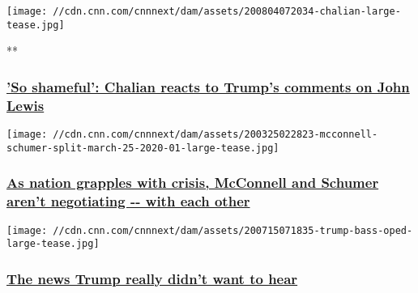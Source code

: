 \href{/videos/politics/2020/08/04/donald-trump-john-lewis-axios-chalian-newday-vpx.cnn}{}

\texttt{[image: //cdn.cnn.com/cnnnext/dam/assets/200804072034-chalian-large-tease.jpg]}

**

\hypertarget{so-shameful-chalian-reacts-to-trumps-comments-on-john-lewis}{%
\subsubsection{\texorpdfstring{\href{/videos/politics/2020/08/04/donald-trump-john-lewis-axios-chalian-newday-vpx.cnn}{'So
shameful': Chalian reacts to Trump's comments on John
Lewis}}{'So shameful': Chalian reacts to Trump's comments on John Lewis}}\label{so-shameful-chalian-reacts-to-trumps-comments-on-john-lewis}}

\href{/2020/08/03/politics/chuck-schumer-mitch-mcconnell-stimulus-negotiations/index.html}{}

\texttt{[image: //cdn.cnn.com/cnnnext/dam/assets/200325022823-mcconnell-schumer-split-march-25-2020-01-large-tease.jpg]}

\hypertarget{as-nation-grapples-with-crisis-mcconnell-and-schumer-arent-negotiating----with-each-other}{%
\subsubsection{\texorpdfstring{\href{/2020/08/03/politics/chuck-schumer-mitch-mcconnell-stimulus-negotiations/index.html}{As
nation grapples with crisis, McConnell and Schumer aren't negotiating
-\/- with each
other}}{As nation grapples with crisis, McConnell and Schumer aren't negotiating -\/- with each other}}\label{as-nation-grapples-with-crisis-mcconnell-and-schumer-arent-negotiating----with-each-other}}

\href{/2020/08/03/opinions/manhattan-da-subpeona-bad-news-trump-honig/index.html}{}

\texttt{[image: //cdn.cnn.com/cnnnext/dam/assets/200715071835-trump-bass-oped-large-tease.jpg]}

\hypertarget{the-news-trump-really-didnt-want-to-hear}{%
\subsubsection{\texorpdfstring{\href{/2020/08/03/opinions/manhattan-da-subpeona-bad-news-trump-honig/index.html}{The
news Trump really didn't want to
hear}}{The news Trump really didn't want to hear}}\label{the-news-trump-really-didnt-want-to-hear}}

